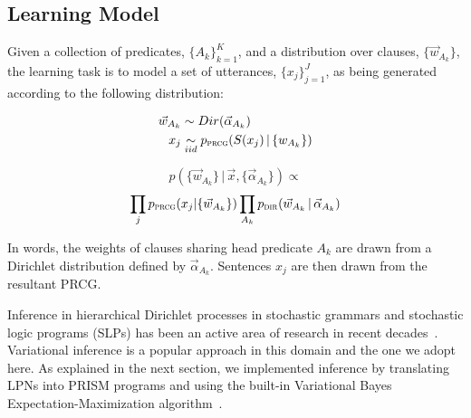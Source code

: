 \documentclass[11pt, twocolumn]{article}
\begin{document}



\subsection{Learning Model}

Given a collection of predicates, $\{A_k\}_{k=1}^{K}$, and a
distribution over clauses, $\{\vec{w}_{A_k}\}$, the learning task is
to model a set of utterances, $\{x_j\}_{j=1}^{J}$, as being generated
according to the following distribution:

\begin{align*}
  \vec{w}_{A_k} &\sim Dir(\vec{\alpha}_{A_k})\\
  x_j &\underset{iid}{\sim} p_{\text{\textsc{prcg}}}(S(x_j)\,|\,\{w_{A_k}\})
\end{align*}

\[ p(\{\vec{w}_{A_k}\}\,|\, \vec{x}, \{\vec{\alpha}_{A_k}\}) \propto\]\[ \prod_j
p_{\text{\textsc{prcg}}}(x_j|\{\vec{w}_{A_k}\}) \prod_{A_k} p_{\text{\textsc{dir}}}(\vec{w}_{A_k}\,|\,\vec{\alpha}_{A_k}) \]

In words, the weights of clauses sharing head predicate $A_k$ are drawn from a Dirichlet distribution defined by $\vec{\alpha}_{A_k}$. Sentences $x_j$ are then drawn from the resultant PRCG.

Inference in hierarchical Dirichlet processes in stochastic grammars
and stochastic logic programs (SLPs) has been an active area of
research in recent decades~\cite{DBLP:conf/emnlp/LiangPJK07,
  goldwater2006contextual, johnson2006adaptor, cussens2001parameter}.
Variational inference is a popular approach in this domain and the one
we adopt here. As explained in the next section, we implemented
inference by translating LPNs into PRISM programs and using the
built-in Variational Bayes Expectation-Maximization
algorithm~\cite{sato2008variational}.
\end{document}
